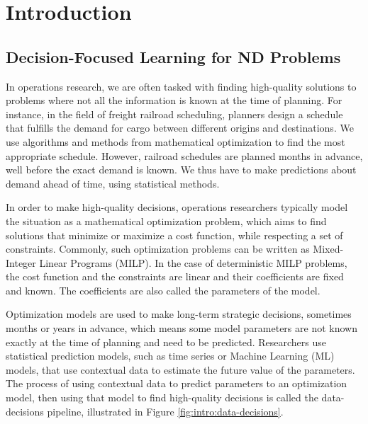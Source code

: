 \chapter{Introduction}


\section{Decision-Focused Learning for ND Problems}

In operations research, we are often tasked with finding high-quality solutions to problems where not all the information is known at the time of planning. For instance, in the field of freight railroad scheduling, planners design a schedule that fulfills the demand for cargo between different origins and destinations. We use algorithms and methods from mathematical optimization to find the most appropriate schedule. However, railroad schedules are planned months in advance, well before the exact demand is known. We thus have to make predictions about demand ahead of time, using statistical methods.

In order to make high-quality decisions, operations researchers typically model the situation as a mathematical optimization problem, which aims to find solutions that minimize or maximize a cost function, while respecting a set of constraints. Commonly, such optimization problems can be written as Mixed-Integer Linear Programs (MILP). In the case of deterministic MILP problems, the cost function and the constraints are linear and their coefficients are fixed and known. The coefficients are also called the parameters of the model.

Optimization models are used to make long-term strategic decisions, sometimes months or years in advance, which means some model parameters are not known exactly at the time of planning and need to be predicted. Researchers use statistical prediction models, such as time series or Machine Learning (ML) models, that use contextual data to estimate the future value of the parameters. The process of using contextual data to predict parameters to an optimization model, then using that model to find high-quality decisions is called the data-decisions pipeline, illustrated in Figure \ref{fig:intro:data-decisions}.

